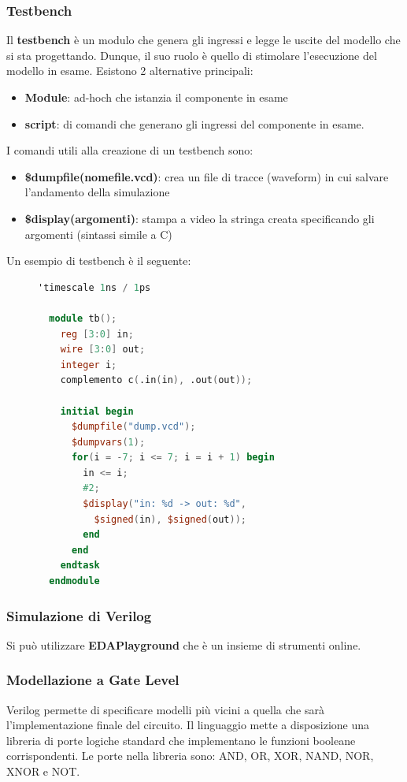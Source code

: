 \documentclass[a4paper]{article}
\theoremstyle{break}
\theoremstyle{break}
\theoremstyle{break}
\theoremstyle{break}
\begin{document}
\subsubsection{Testbench}
Il \textbf{testbench} è un modulo che genera gli ingressi e legge le uscite del modello
che si sta progettando. Dunque, il suo ruolo è quello di stimolare l'esecuzione del
modello in esame. Esistono 2 alternative principali:
\begin{itemize}
  \item \textbf{Module}: ad-hoch che istanzia il componente in esame
  \item \textbf{script}: di comandi che generano gli ingressi del componente in esame.
\end{itemize}
I comandi utili alla creazione di un testbench sono:
\begin{itemize}
  \item \textbf{\$dumpfile(nomefile.vcd)}: crea un file di tracce (waveform) in cui
    salvare l'andamento della simulazione
  \item \textbf{\$display(argomenti)}: stampa a video la stringa creata specificando
    gli argomenti (sintassi simile a C)
\end{itemize}
Un esempio di testbench è il seguente:
\begin{figure}[H]
  \begin{example}
    \begin{lstlisting}[language=Verilog]
  'timescale 1ns / 1ps

  module tb();
    reg [3:0] in;
    wire [3:0] out;
    integer i;
    complemento c(.in(in), .out(out));

    initial begin
      $dumpfile("dump.vcd");
      $dumpvars(1);
      for(i = -7; i <= 7; i = i + 1) begin
        in <= i;
        #2;
        $display("in: %d -> out: %d",
          $signed(in), $signed(out));
        end
      end
    endtask
  endmodule
    \end{lstlisting}
  \end{example}
\end{figure}

\subsubsection{Simulazione di Verilog}
Si può utilizzare \textbf{EDAPlayground} che è un insieme di strumenti online.

\subsubsection{Modellazione a Gate Level}
Verilog permette di specificare modelli più vicini a quella che sarà l'implementazione
finale del circuito. Il linguaggio mette a disposizione una libreria di porte logiche
standard che implementano le funzioni booleane corrispondenti. Le porte nella libreria
sono: AND, OR, XOR, NAND, NOR, XNOR e NOT.
\end{document}
